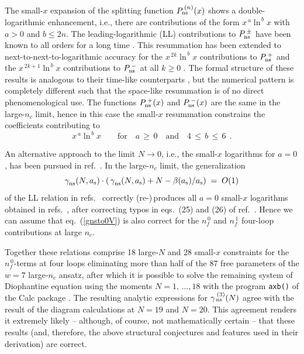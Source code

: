 \documentclass[12pt]{article}
\newcommand{\beq}{\begin{equation}}
\newcommand{\eeq}{\end{equation}}
\newcommand{\ra}{\rightarrow}
\newcommand{\ars}{a_{\rm s}}
\def\nc{{n_c}}
\def\nfz{{n^{\,0}_{\! f}}}
\def\nfo{{n^{\,1}_{\! f}}}
\begin{document}
The small-$x$ expansion of the splitting function $P_{\rm ns}^{\:(n)}(x)$ 
shows a double-logarithmic enhancement, i.e., there are contributions of the 
form $x^{\,a} \ln^{\,b\!}x$ with $a>0$ and $b \leq 2n$. 
The leading-logarithmic (LL) contributions to $P_{\rm ns}^{\:\pm}$ have been 
known to all orders for a long time \cite{Kirschner:1983di,Blumlein:1995jp}. 
This resummation has been extended to next-to-next-to-logarithmic 
accuracy for the $x^{\,2k} \ln^{\,b\!}x$ contributions to $P_{\rm ns}^{\:+}$ 
and the $x^{\,2k+1} \ln^{\,b\!}x$ contributions to $P_{\rm ns}^{\:-}$ at all 
$k\geq 0$ \cite{Vogt:2012gb,KDVprep}. 
The formal structure of these results is analogous to their time-like 
counterparts \cite{Vogt:2011jv,Kom:2012hd}, but the numerical pattern is 
completely different such that the space-like resummation is of no direct 
phenomenological use. 
The functions $P_{\rm ns}^{\:+}(x)$ and $P_{\rm ns}^{\:-}(x)$ are the same in 
the large-$\nc$ limit, hence in this case the small-$x$ resummation constrains 
the coefficients contributing to 
%
\beq
  x^{\,a} \ln^{\,b\!}x \qquad \mbox{for~~~} a \,\geq\, 0 
  \mbox{~~~and~~~} 4 \,\leq\, b \,\leq\, 6 
\:\: .
\eeq
 
An alternative approach to the limit $N \ra 0$, i.e., the small-$x$ logarithms
for $a=0$, has been pursued in ref.~\cite{Velizhanin:2014dia}. 
In the large-$\nc$ limit, the generalization
%
\beq
\label{gnsto0V}
  \gamma_{\rm ns}^{}(N,\ars) \cdot \left( \,\gamma_{\rm ns}^{}(N,\ars)
  + N - \beta(\ars) / \ars \right) \;=\; O(1)
\eeq
%
of the LL relation in refs.~\cite{Kirschner:1983di,Blumlein:1995jp}
correctly (re-)$\,$produces all $a=0$ small-$x$ logarithms obtained in 
refs.~\cite{Moch:2004pa,Vogt:2012gb,Davies:2016jie}, after correcting  
typos in eqs.~(25) and (26) of ref.~\cite{Velizhanin:2014dia}. 
Hence we can assume that eq.~(\ref{gnsto0V}) is also correct for the 
$\nfz$ and $\nfo$ four-loop contributions at large $\nc$.

\bigskip

Together these relations comprise 18 large-$N$ and 28 small-$x$ constraints 
for the $\nfz$-terms at four loops eliminating 
more than half of the 87 free parameters of the $w\!=\!7$ large-$\nc$ ansatz, 
after which it is possible to solve the remaining system of Diophantine equation using 
the moments $N=1,\, \ldots, 18$ with the program {\tt axb()} of the 
{\sc Calc} package \cite{Calc}.
The resulting analytic expressions for $\gamma_{\,\rm ns}^{\:(3)}(N)$ 
agree with the result of the diagram calculations at $N=19$ and $N=20$. 
This agreement renders it extremely likely -- although, of course, not
mathematically certain -- that these results (and, therefore, the above 
structural conjectures and features used in their derivation) are correct.
\end{document}
